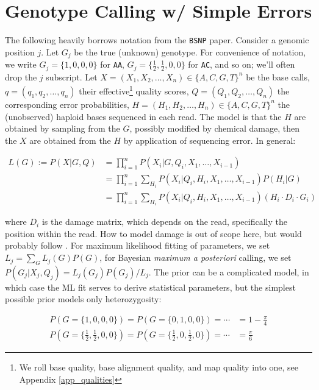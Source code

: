 \documentclass{article}
\begin{document}
\section{Genotype Calling w/ Simple Errors}

The following heavily borrows notation from the \texttt{BSNP}\cite{bsnp} paper.  Consider a
genomic position $j$.  Let $G_j$ be the true (unknown) genotype.  For
convenience of notation, we write $G_j=\{1,0,0,0\}$ for \texttt{AA},
$G_j=\{\frac{1}{2},\frac{1}{2},0,0\}$ for \texttt{AC}, and so on; we'll
often drop the $j$ subscript.  Let $X=(X_1, X_2, \ldots, X_n) \in
\{A,C,G,T\}^n$ be the base calls, $q=(q_1, q_2, \ldots, q_n)$ their
effective\footnote{We roll base quality, base alignment quality, and map
quality into one, see Appendix \ref{app_qualities}} quality scores, $Q=(Q_1, Q_2,
\ldots, Q_n)$ the corresponding error probabilities, $H=(H_1, H_2,
\ldots, H_n) \in \{A,C,G,T\}^n$ the (unobserved) haploid bases
sequenced in each read.  The model is that the $H$ are obtained by
sampling from the $G$, possibly modified by chemical damage, then the
$X$ are obtained from the $H$ by application of sequencing error.  In
general:

\begin{align*}
L(G) := P(X|G,Q) &= \prod_{i=1}^n P(X_i|G,Q_i,X_1,\ldots,X_{i-1}) \\
     &= \prod_{i=1}^n \sum_{H_i} P(X_i|Q_i,H_i,X_1,\ldots,X_{i-1}) P(H_i|G) \\
     &= \prod_{i=1}^n \sum_{H_i} P(X_i|Q_i,H_i,X_1,\ldots,X_{i-1}) (H_i \cdot D_i \cdot G_i)
\end{align*}

where $D_i$ is the damage matrix, which depends on the read,
specifically the position within the read.  How to model damage is out
of scope here, but would probably follow \cite{mapdamage}.
For maximum likelihood fitting of parameters, we set $L_j = \sum_G L_j(G) P(G)$, for Bayesian \emph{maximum a posteriori} calling,
we set $P(G_j|X_j,Q_j) = L_j(G_j) P(G_j) / L_j$.  The prior can be a complicated model, in which case the ML fit serves to
derive statistical parameters, but the simplest possible prior models only heterozygosity:

\begin{align*}
P(G=\{1,0,0,0\}) = P(G=\{0,1,0,0\}) = \cdots &= 1 - \frac{\pi}{4} \\
P(G=\{\frac{1}{2},\frac{1}{2},0,0\}) = P(G=\{\frac{1}{2},0,\frac{1}{2},0\}) = \cdots &= \frac{\pi}{6}
\end{align*}
\end{document}
